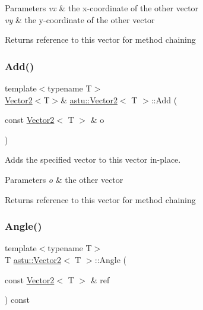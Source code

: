 \begin{DoxyParams}{Parameters}
{\em vx} & the x-\/coordinate of the other vector \\
\hline
{\em vy} & the y-\/coordinate of the other vector \\
\hline
\end{DoxyParams}
\begin{DoxyReturn}{Returns}
reference to this vector for method chaining 
\end{DoxyReturn}
\mbox{\label{classastu_1_1Vector2_a9178bef75f9481b673a6b1fc9f13387f}} 
\subsubsection{\texorpdfstring{Add()}{Add()}\hspace{0.1cm}{\footnotesize\ttfamily [2/2]}}
{\footnotesize\ttfamily template$<$typename T$>$ \\
\hyperlink{classastu_1_1Vector2}{Vector2}$<$T$>$\& \hyperlink{classastu_1_1Vector2}{astu\+::\+Vector2}$<$ T $>$\+::Add (\begin{DoxyParamCaption}\item[{const \hyperlink{classastu_1_1Vector2}{Vector2}$<$ T $>$ \&}]{o }\end{DoxyParamCaption})\hspace{0.3cm}{\ttfamily [inline]}}

Adds the specified vector to this vector in-\/place.


\begin{DoxyParams}{Parameters}
{\em o} & the other vector \\
\hline
\end{DoxyParams}
\begin{DoxyReturn}{Returns}
reference to this vector for method chaining 
\end{DoxyReturn}
\mbox{\label{classastu_1_1Vector2_af44c9648648cb03637f520669e9a2d8e}} 
\subsubsection{\texorpdfstring{Angle()}{Angle()}}
{\footnotesize\ttfamily template$<$typename T$>$ \\
T \hyperlink{classastu_1_1Vector2}{astu\+::\+Vector2}$<$ T $>$\+::Angle (\begin{DoxyParamCaption}\item[{const \hyperlink{classastu_1_1Vector2}{Vector2}$<$ T $>$ \&}]{ref }\end{DoxyParamCaption}) const\hspace{0.3cm}{\ttfamily [inline]}}

